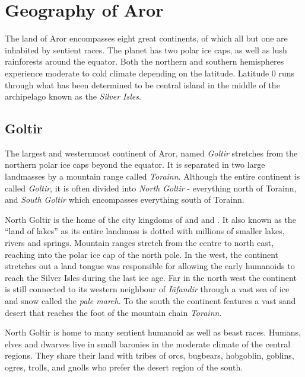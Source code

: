 \section{Geography of Aror}
\label{sec:Geography}

The land of Aror encompasses eight great continents, of which all but one are
inhabited by sentient races. The planet has two polar ice caps, as well as lush
rainforests around the equator. Both the northern and southern hemispheres
experience moderate to cold climate depending on the latitude. Latitude 0 runs
through what has been determined to be central island in the middle of the
archipelago known as the \emph{Silver Isles}.

\subsection{Goltir}
\label{sec:Goltir}

The largest and westernmost continent of Aror, named \emph{Goltir} stretches
from the northern polar ice caps beyond the equator. It is separated in two
large landmasses by a mountain range called \emph{Torainn}. Although the
entire continent is called \emph{Goltir}, it is often divided into \emph{North
  Goltir} - everything north of Torainn, and \emph{South Goltir} which
encompasses everything south of Torainn.

North Goltir is the home of the city kingdoms of  and
 and . It also known as the ``land
of lakes'' as its entire landmass is dotted with millions of smaller lakes,
rivers and springs. Mountain ranges stretch from the centre to north east,
reaching into the polar ice cap of the north pole. In the west, the continent
stretches out a land tongue was responsible for allowing the early humanoids
to reach the Silver Isles during the last ice age. Far in the north west the
continent is still connected to its western neighbour of \emph{Iâfandir}
through a vast sea of ice and snow called the \emph{pale march}. To the south
the continent features a vast sand desert that reaches the foot of the
mountain chain \emph{Torainn}.

North Goltir is home to many sentient humanoid as well as beast races. Humans,
elves and dwarves live in small baronies in the moderate climate of the
central regions. They share their land with tribes of orcs, bugbears,
hobgoblin, goblins, ogres, trolls, and gnolls who prefer the desert region of
the south.

